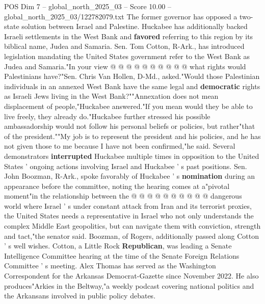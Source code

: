 \begin{textsample}{POS Dim 7 – global\_north\_2025\_03 – Score 10.00 – global\_north\_2025\_03/122782079.txt}
The former governor has opposed a two-state solution between Israel and Palestine.
Huckabee has additionally backed Israeli settlements in the West Bank and \textbf{favored} referring to this region by its biblical name, Judea and Samaria.
Sen.
Tom Cotton, R-Ark., has introduced legislation mandating the United States government refer to the West Bank as Judea and Samaria."In your view @ @ @ @ @ @ @ @ @ @ what rights would Palestinians have?"Sen.
Chris Van Hollen, D-Md., asked."Would those Palestinian individuals in an annexed West Bank have the same legal and \textbf{democratic} rights as Israeli Jews living in the West Bank?""Annexation does not mean displacement of people,"Huckabee answered."If you mean would they be able to live freely, they already do."Huckabee further stressed his possible ambassadorship would not follow his personal beliefs or policies, but rather"that of the president.""My job is to represent the president and his policies, and he has not given those to me because I have not been confirmed,"he said.
Several demonstrators \textbf{interrupted} Huckabee multiple times in opposition to the United States ' ongoing actions involving Israel and Huckabee ' s past positions.
Sen.
John Boozman, R-Ark., spoke favorably of Huckabee ' s \textbf{nomination} during an appearance before the committee, noting the hearing comes at a"pivotal moment"in the relationship between the @ @ @ @ @ @ @ @ @ @ dangerous world where Israel ' s under constant attack from Iran and its terrorist proxies, the United States needs a representative in Israel who not only understands the complex Middle East geopolitics, but can navigate them with conviction, strength and tact,"the senator said.
Boozman, of Rogers, additionally passed along Cotton ' s well wishes.
Cotton, a Little Rock \textbf{Republican}, was leading a Senate Intelligence Committee hearing at the time of the Senate Foreign Relations Committee ' s meeting.
Alex Thomas has served as the Washington Correspondent for the Arkansas Democrat-Gazette since November 2022.
He also produces"Arkies in the Beltway,"a weekly podcast covering national politics and the Arkansans involved in public policy debates.

\end{textsample}
